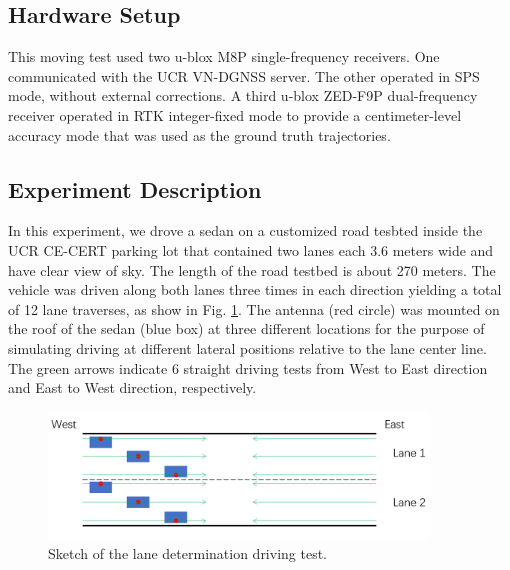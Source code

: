 \documentclass[letterpaper, 10 pt,onecolumn]{article}
\begin{document}
	\subsection{Hardware Setup}
	This moving test used two u-blox M8P single-frequency receivers. 
	One communicated with the UCR VN-DGNSS server. The other operated in SPS mode, without external corrections. A third u-blox ZED-F9P dual-frequency receiver operated in RTK integer-fixed mode to provide a centimeter-level accuracy mode that was used as the ground truth trajectories.
	
	\subsection{Experiment Description}
	In this experiment, we drove a sedan on a customized road tesbted inside the UCR CE-CERT parking lot that contained two lanes each 3.6 meters wide \red and have clear view of sky. \black The length of the road testbed is about 270 meters. The vehicle was driven along both lanes three times in each direction yielding a total of 12 lane traverses, as show in Fig. \ref{fig:LDsk}.
	The antenna (red circle) was mounted on the roof of the sedan (blue box) at three different locations for the purpose of simulating driving at different lateral positions relative to the lane center line. The green arrows indicate 6 straight driving tests from West to East direction and East to West direction, respectively. 
	\begin{figure}[H]		
		\centering		
		\includegraphics[width=0.9\textwidth]{figures/LDsketch.png}	
		\caption{Sketch of the lane determination driving test.}		
		\label{fig:LDsk}	
	\end{figure}
	
\end{document}
